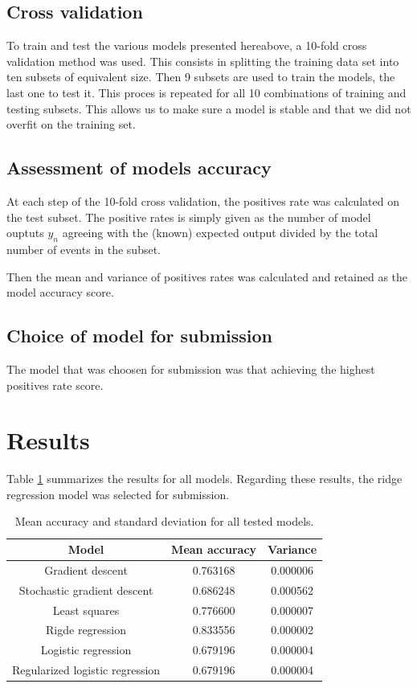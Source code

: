 \documentclass[10pt,conference,compsocconf]{IEEEtran}
\begin{document}
\subsection{Cross validation}

To train and test the various models presented hereabove, a 10-fold cross validation method was used. This consists in splitting the training data set into ten subsets of equivalent size. Then 9 subsets are used to train the models, the last one to test it. This proces is repeated for all 10 combinations of training and testing subsets. This allows us to make sure a model is stable and that we did not overfit on the training set.

\subsection{Assessment of models accuracy}

At each step of the 10-fold cross validation, the positives rate was calculated on the test subset. The positive rates is simply given as the number of model ouptuts $y_n$ agreeing with the (known) expected output divided by the total number of events in the subset.

Then the mean and variance of positives rates was calculated and retained as the model accuracy score.

\subsection{Choice of model for submission}

The model that was choosen for submission was that achieving the highest positives rate score.

\section{Results}

Table \ref{res_table} summarizes the results for all models. Regarding these results, the ridge regression model was selected for submission.

\begin{table}[htp]
\centering
\begin{tabular}[c]{|c|c|c|}
  \hline
  \textbf{Model} & \textbf{Mean accuracy} & \textbf{Variance} \\
  \hline
  Gradient descent & 0.763168 & 0.000006 \\
  \hline
  Stochastic gradient descent & 0.686248 & 0.000562 \\
  \hline
  Least squares & 0.776600 & 0.000007 \\
  \hline
  Rigde regression & 0.833556 & 0.000002 \\
  \hline
  Logistic regression & 0.679196 & 0.000004 \\
  \hline
  Regularized logistic regression & 0.679196 & 0.000004 \\
  
  \hline
\end{tabular}
\caption{\label{res_table} Mean accuracy and standard deviation for all tested models.}
\end{table}
\end{document}
